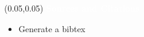 \documentclass[aspectratio=169]{beamer} %
\begin{document}
\begin{frame}{}
    \setlength{\TPHorizModule}{\textwidth}
    \setlength{\TPVertModule}{\textwidth}
    \begin{textblock}{0.74}(0.05,0.05)
        \bfseries\large\textcolor{white}{Sources and Citations}
    \end{textblock}
    \begin{itemize}
        \item Generate a bibtex
    \end{itemize}
\end{frame}
\end{document}
